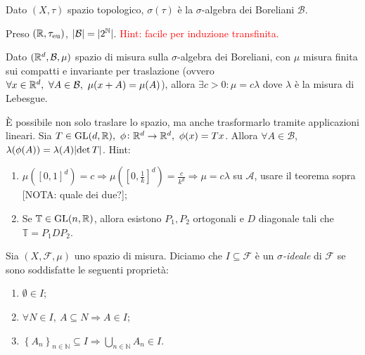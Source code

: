 \begin{definition}
	Dato $(X,\tau)$ spazio topologico, $\sigma(\tau)$ è la $\sigma$-algebra dei Boreliani $\mathcal{B}$.
\end{definition}
\begin{exercise}
	Preso $ (\mathbb{R},\tau_{\text{eu}}) $, $\left|\mathcal{B}\right| = |2^{\mathbb{N}}| $.
	\textcolor{red}{Hint: facile per induzione transfinita.}
\end{exercise} 
\begin{exercise}
	Dato $(\mathbb{R}^d, \mathcal{B}, \mu)$ spazio di misura sulla $\sigma$-algebra dei Boreliani, con $\mu$ misura finita sui compatti e invariante per traslazione (ovvero $\forall x \in \R^d,\ \forall A \in \mathcal{B},\ \mu(x+A)=\mu(A)$), allora $\exists c > 0 : \mu=c\lambda$ dove $\lambda$ è la misura di Lebesgue.
\end{exercise}
\begin{exercise}
	È possibile non solo traslare lo spazio, ma anche trasformarlo tramite applicazioni lineari. Sia $T\in\mathrm{GL}(d,\R),\ \phi\colon\R^d \to \R^d,\ \phi(x)=Tx$. Allora $\forall A \in \mathcal{B}$, $ {\lambda(\phi(A))=\lambda(A)\abs{\det T} }$.
	Hint:
	\begin{enumerate}
		\item $\mu\left ([0,1]^d\right )=c\Rightarrow \mu\left ([0, \frac{1}{k}]^d\right )=\frac{c}{k^d}\Rightarrow \mu=c\lambda$ su $\mathcal{A}$, usare il teorema sopra {\color{red}[NOTA: quale dei due?]};
		\item Se $\mathbb{T} \in \mathrm{GL}(n,\mathbb{R})$, allora esistono $P_1, P_2$ ortogonali e $D$ diagonale tali che $\mathbb{T}=P_1DP_2$.
	\end{enumerate}
\end{exercise}

\begin{definition}
	Sia $ (X,\mathcal{F},\mu) $ uno spazio di misura. Diciamo che $ I\subseteq\mathcal{F} $ è un \emph{$ \sigma $-ideale} di $ \mathcal{F} $ se sono soddisfatte le seguenti proprietà:
	\begin{enumerate}[label=(\roman*)]
		\item $ \emptyset\in I $;
		\item $ \forall N\in I,\ A\subseteq N \Rightarrow A \in I $;
		\item $ \left\{A_n \right\}_{n\in\mathbb{N}} \subseteq I \Rightarrow \bigcup\limits_{n\in\mathbb{N}} A_n\in I $.
	\end{enumerate}
\end{definition}


